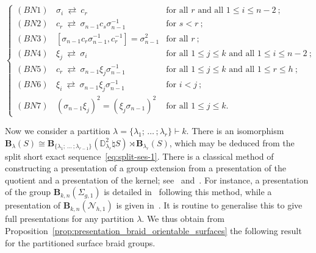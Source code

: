 \documentclass[AHL,Unicode,published]{cedram}
\newcommand{\B}{\ensuremath{\mathbf{B}}}
\newcommand{\N}{\mathscr{N}}
\newcommand{\bD}{\mathbb{D}}
\renewcommand{\leq}{\leqslant}
\begin{document}
\begin{prop}
\begin{equation}\label{eq:relations_braids_on_non_orientable_surface}
\begin{cases}
(BN1)\ \text{ }\sigma_i\ \rightleftarrows\ c_r & \text{for all $r$ and all $1\leq i\leq n-2 $}\ ;\\
(BN2)\ \text{ } c_r\ \rightleftarrows\ \sigma_{n-1} c_s \sigma_{n-1}^{-1} & \text{for $s < r$}\ ;\\
(BN3)\ \text{ }\left[\sigma_{n-1} c_r \sigma_{n-1}^{-1}, c_r^{-1}\right] = \sigma_{n-1}^2 & \text{for all $r$}\ ;\\
(BN4)\ \text{ }\xi_j\ \rightleftarrows\ \sigma_i & \text{for all $1\leq j \leq k$ and all $1\leq i\leq n-2 $}\ ;\\
(BN5)\ \text{ }c_r\ \rightleftarrows\ \sigma_{n-1} \xi_j \sigma_{n-1}^{-1} & \text{for all $1\leq j \leq k$ and all $1\leq r\leq h$}\ ;\\
(BN6)\ \text{ }\xi_i\ \rightleftarrows\ \sigma_{n-1} \xi_j \sigma_{n-1}^{-1} & \text{for $i < j$}\ ;\\
(BN7)\ \text{ }(\sigma_{n-1} \xi_j)^2 = (\xi_j \sigma_{n-1})^2 & \text{for all $1\leq j \leq k$}.
\end{cases}
\end{equation}
\end{prop}

Now we consider a partition $\lambda = \boldsymbol{\{} \lambda_{1};\,\ldots\,;\lambda_{r} \boldsymbol{\}} \vdash k$. There is an isomorphism $\B_{\lambda}(S) \cong \B_{\boldsymbol{\{} \lambda_{1};\,\ldots\,;\lambda_{r-1} \boldsymbol{\}}}(\bD^{2}_{\lambda_{r}}\natural S) \rtimes \B_{\lambda_{r}}(S)$, which may be deduced from the split short exact sequence~\eqref{eq:split-ses-1}. There is a classical method of constructing a presentation of a group extension from a presentation of the quotient and a presentation of the kernel; see~\cite[\S~2.4.3]{HBE} and~\cite[Appendix~B]{DPS}. For instance, a presentation of the group $\B_{k,n}(\Sigma_{g,1})$ is detailed in~\cite[Prop.~3.2]{BellingeriGodelleGuaschi} following this method, while a presentation of $\B_{k,n}(\N_{h,1})$ is given in~\cite[Prop.~6.58]{DPS}. It is routine to generalise this to give full presentations for any partition $\lambda$. We thus obtain from Proposition~\ref{prop:presentation_braid_orientable_surfaces} the following result for the partitioned surface braid groups.
\end{document}
